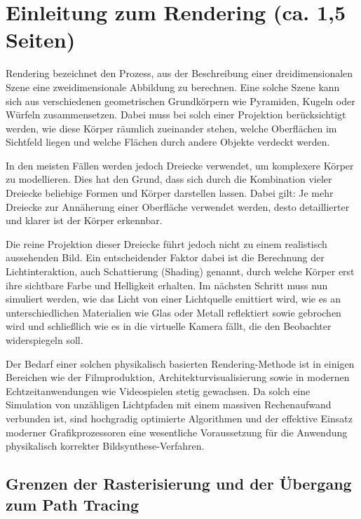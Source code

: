\section{Einleitung zum Rendering (ca. 1,5 Seiten)}


Rendering bezeichnet den Prozess, aus der Beschreibung einer dreidimensionalen Szene eine zweidimensionale Abbildung zu berechnen. Eine solche Szene kann sich aus verschiedenen geometrischen Grundkörpern wie \zb Pyramiden, Kugeln oder Würfeln zusammensetzen. Dabei muss bei solch einer Projektion berücksichtigt werden, wie diese Körper räumlich zueinander stehen, welche Oberflächen im Sichtfeld liegen und welche Flächen durch andere Objekte verdeckt werden. \cite{chapman:13}

In den meisten Fällen werden jedoch Dreiecke verwendet, um komplexere Körper zu modellieren. Dies hat den Grund, dass sich durch die Kombination vieler Dreiecke beliebige Formen und Körper darstellen lassen. Dabei gilt: Je mehr Dreiecke zur Annäherung einer Oberfläche verwendet werden, desto detaillierter und klarer ist der Körper erkennbar. \cite{twodee:triangles}

Die reine Projektion dieser Dreiecke führt jedoch nicht zu einem realistisch aussehenden Bild. Ein entscheidender Faktor dabei ist die Berechnung der Lichtinteraktion, auch Schattierung (Shading) genannt, durch welche Körper erst ihre sichtbare Farbe und Helligkeit erhalten. Im nächsten Schritt muss nun simuliert werden, wie das Licht von einer Lichtquelle emittiert wird, wie es an unterschiedlichen Materialien wie Glas oder Metall reflektiert sowie gebrochen wird und schließlich wie es in die virtuelle Kamera fällt, die den Beobachter widerspiegeln soll. \cite{stuart:24, christensen:16}

Der Bedarf einer solchen physikalisch basierten Rendering-Methode ist in einigen Bereichen wie der Filmproduktion, Architekturvisualisierung sowie in modernen Echtzeitanwendungen wie Videospielen stetig gewachsen. Da solch eine Simulation von unzähligen Lichtpfaden mit einem massiven Rechenaufwand verbunden ist, sind hochgradig optimierte Algorithmen und der effektive Einsatz moderner Grafikprozessoren eine wesentliche Voraussetzung für die Anwendung physikalisch korrekter Bildsynthese-Verfahren. \cite{christensen:16, nvidia:rt}

\subsection{Grenzen der Rasterisierung und der Übergang zum Path Tracing}


